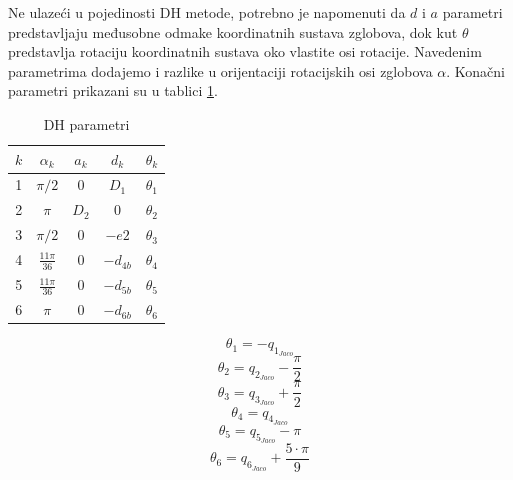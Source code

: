\documentclass[times, utf8, diplomski, numeric]{fer}
\begin{document}

Ne ulazeći u pojedinosti DH metode, potrebno je napomenuti da $d$ i $a$ parametri predstavljaju međusobne odmake koordinatnih sustava zglobova, dok kut $\theta$ predstavlja rotaciju koordinatnih sustava oko vlastite osi rotacije. Navedenim parametrima dodajemo i razlike u orijentaciji rotacijskih osi zglobova $\alpha$. Konačni parametri prikazani su u tablici \ref{JacoDH}. 
 \begin{table}[h!]
\centering
\begin{tabular}{c c c c c}
\hline\hline
$ k $ & $ \alpha_{k} $ & $ a_{k} $ & $ d_{k} $ & $ \theta_{k} $ \\
\hline
1 & $ \pi/2 $ & $ 0 $ & $ D_{1} $ & $ \theta_{1} $\\
2 & $ \pi $ & $ D_{2} $ & 0 & $ \theta_{2} $\\
3 & $ \pi/2 $ & 0 & $ -e2 $ & $ \theta_{3} $\\
4 & $ \frac{11\pi}{36} $ & 0 & $ -d_{4b} $ & $ \theta_{4} $\\
5 & $ \frac{11\pi}{36}  $ & 0 & $ -d_{5b} $ & $ \theta_{5} $\\
6 & $ \pi $ & 0 & $ -d_{6b} $ & $ \theta_{6} $\\
\hline
\end{tabular}
\caption{DH parametri} \label{JacoDH}
\end{table}
 \begin{equation}
\theta_{1}=-q_{1_{Jaco}}
\label{q1}
\end{equation}
\begin{equation}
\theta_{2}=q_{2_{Jaco}}-\frac{\pi}{2}
\label{q2}
\end{equation}
\begin{equation}
\theta_{3}=q_{3_{Jaco}}+\frac{\pi}{2}
\label{q3}
\end{equation}
\begin{equation}
\theta_{4}=q_{4_{Jaco}}
\label{q4}
\end{equation}
\begin{equation}
\theta_{5}=q_{5_{Jaco}}-\pi
\label{q5}
\end{equation}
\begin{equation}
\theta_{6}=q_{6_{Jaco}}+\dfrac{5\cdot \pi}{9}
\label{q6}
\end{equation}
\end{document}
